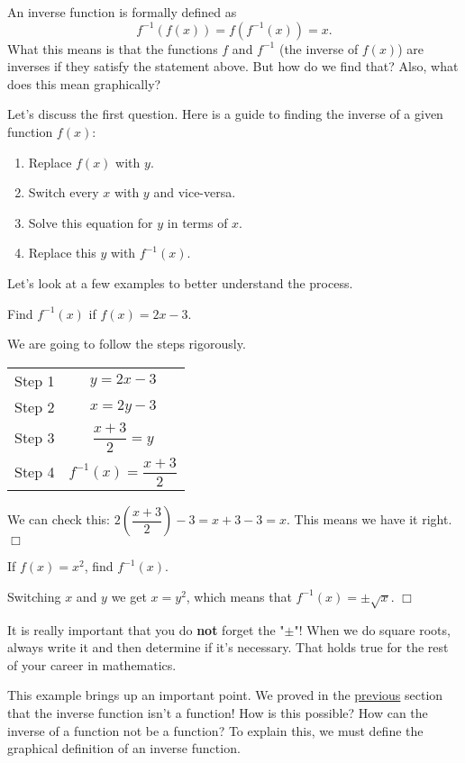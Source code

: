 \documentclass[lang=en,11pt]{elegantbook}
\begin{document}
An inverse function is formally defined as $$f^{-1}\left(f(x)\right)=f\left(f^{-1}(x)\right)=x.$$
What this means is that the functions $f$ and $f^{-1}$ (the inverse of $f(x)$) are inverses if they satisfy the statement above.  But how do we find that?  Also, what does this mean graphically?

Let's discuss the first question.  Here is a guide to finding the inverse of a given function $f(x)$: \begin{enumerate}
    \item Replace $f(x)$ with $y$.
    \item Switch every $x$ with $y$ and vice-versa.
    \item Solve this equation for $y$ in terms of $x$.
    \item Replace this $y$ with $f^{-1}(x)$.
\end{enumerate}
Let's look at a few examples to better understand the process.
\begin{example}
Find $f^{-1}(x)$ if $f(x)=2x-3$.
\end{example}
\begin{solution}
We are going to follow the steps rigorously.
\begin{center}
    \begin{tabular}{c c}
        Step 1 & $y=2x-3$ \\
        Step 2 & $x=2y-3$ \\
        Step 3 & $\dfrac{x+3}{2}=y$ \\
        Step 4 & $f^{-1}(x)=\dfrac{x+3}{2}$
    \end{tabular}
\end{center}
We can check this: $\displaystyle 2\left(\dfrac{x+3}{2}\right)-3=x+3-3=x$.  This means we have it right.  $\Box$
\end{solution}
\begin{example}
If $f(x)=x^2$, find $f^{-1}(x)$.
\end{example}
\begin{solution}
Switching $x$ and $y$ we get $x=y^2$, which means that $f^{-1}(x)=\pm\sqrt{x}$.  $\Box$
\end{solution}
\begin{note}
It is really important that you do \textbf{not} forget the "$\pm$"!  When we do square roots, always write it and then determine if it's necessary.  That holds true for the rest of your career in mathematics.
\end{note}
This example brings up an important point.  We proved in the \hyperlink{section.2.2}{previous} section that the inverse function isn't a function!  How is this possible?  How can the inverse of a function not be a function?  To explain this, we must define the graphical definition of an inverse function.
\end{document}
